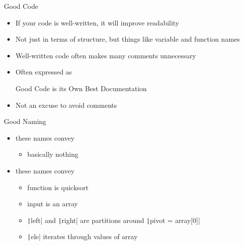 \begin{frame}{Good Code}
    \begin{itemize}[<+->]
        \item If your code is well-written, it will improve readability
        \item Not just in terms of structure, but things like variable and function names
        \item Well-written code often makes many comments \alert{unnecessary}
        \item Often expressed as
              \begin{block}{}
                  Good Code is its Own Best Documentation
              \end{block}
        \item Not an excuse to avoid comments
    \end{itemize}
\end{frame}

\begin{frame}{Good Naming}
    \pause
    \begin{multicols}{2}
        \begin{itemize}
            \item<3-4> these names convey
                  \begin{itemize}[<+->]
                      \item<4> basically nothing
                  \end{itemize}
        \end{itemize}
        \vfill\null
        \columnbreak
        \begin{itemize}
            \item<6-10> these names convey
                  \begin{itemize}
                      \item<7-10> function is quicksort
                      \item<8-10> input is an array
                      \item<9-10> \texttt|left| and \texttt|right| are partitions around \texttt|pivot = array[0]|
                      \item<10> \texttt|ele| iterates through values of array
                  \end{itemize}
        \end{itemize}
    \end{multicols}
\end{frame}

